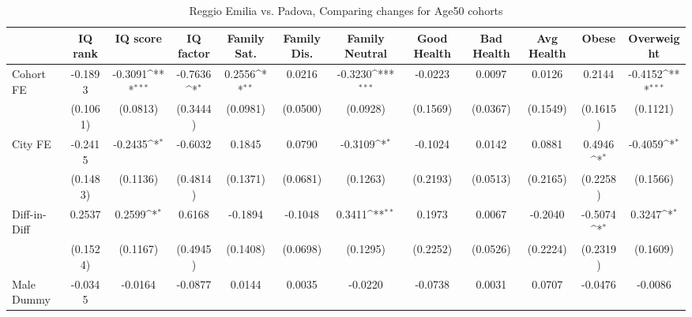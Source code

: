 \begin{table}[htbp]\centering
\def\sym#1{\ifmmode^{#1}\else\(^{#1}\)\fi}
\caption{Reggio Emilia vs. Padova, Comparing changes for Age50 cohorts}
\begin{tabular*}{0.7\hsize}{@{\hskip\tabcolsep\extracolsep\fill}l*{11}{c}}
\toprule
            &\multicolumn{1}{c}{IQ rank}&\multicolumn{1}{c}{IQ score}&\multicolumn{1}{c}{IQ factor}&\multicolumn{1}{c}{Family Sat.}&\multicolumn{1}{c}{Family Dis.}&\multicolumn{1}{c}{Family Neutral}&\multicolumn{1}{c}{Good Health}&\multicolumn{1}{c}{Bad Health}&\multicolumn{1}{c}{Avg Health}&\multicolumn{1}{c}{Obese}&\multicolumn{1}{c}{Overweight}\\
\midrule
Cohort FE   &     -0.1893         &     -0.3091\sym{***}&     -0.7636\sym{*}  &      0.2556\sym{**} &      0.0216         &     -0.3230\sym{***}&     -0.0223         &      0.0097         &      0.0126         &      0.2144         &     -0.4152\sym{***}\\
            &    (0.1061)         &    (0.0813)         &    (0.3444)         &    (0.0981)         &    (0.0500)         &    (0.0928)         &    (0.1569)         &    (0.0367)         &    (0.1549)         &    (0.1615)         &    (0.1121)         \\
\addlinespace
City FE     &     -0.2415         &     -0.2435\sym{*}  &     -0.6032         &      0.1845         &      0.0790         &     -0.3109\sym{*}  &     -0.1024         &      0.0142         &      0.0881         &      0.4946\sym{*}  &     -0.4059\sym{*}  \\
            &    (0.1483)         &    (0.1136)         &    (0.4814)         &    (0.1371)         &    (0.0681)         &    (0.1263)         &    (0.2193)         &    (0.0513)         &    (0.2165)         &    (0.2258)         &    (0.1566)         \\
\addlinespace
Diff-in-Diff&      0.2537         &      0.2599\sym{*}  &      0.6168         &     -0.1894         &     -0.1048         &      0.3411\sym{**} &      0.1973         &      0.0067         &     -0.2040         &     -0.5074\sym{*}  &      0.3247\sym{*}  \\
            &    (0.1524)         &    (0.1167)         &    (0.4945)         &    (0.1408)         &    (0.0698)         &    (0.1295)         &    (0.2252)         &    (0.0526)         &    (0.2224)         &    (0.2319)         &    (0.1609)         \\
\addlinespace
Male Dummy  &     -0.0345         &     -0.0164         &     -0.0877         &      0.0144         &      0.0035         &     -0.0220         &     -0.0738         &      0.0031         &      0.0707         &     -0.0476         &     -0.0086         \\

\end{tabular*}
\end{table}
